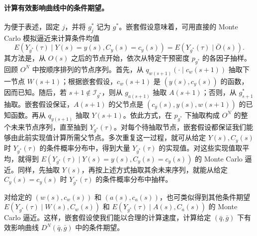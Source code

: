 \paragraph{计算有效影响曲线中的条件期望。}
为便于表述，固定 $j$，并将 $g_j^*$ 记为 $g^*$。嵌套假设意味着，可用直接的 Monte Carlo 模拟逼近来计算条件均值
\[
 E(Y_{g^*}(\tau)\mid Y(s)=y(s),C_y(s)=c_y(s))
 =E(Y_{g^*}(\tau)\mid\bar O(s)).
\]
其方法是，从 $O(s)$ 之后的节点开始，依次从特定干预密度 $p_{g^*}$ 的各因子抽样。回顾 $O^N$ 中按顺序排列的节点序列。首先，从 $q_{w(s+1)}(\cdot\mid c_w(s+1))$ 抽取下一节点 $W(s+1)$；根据嵌套假设，$c_w(s+1)$ 是 $(y(s),c_y(s))$ 的函数，因而已知。随后，若 $s+1\notin\mathcal I_{g^*}$，则从 $g_{a(s+1)}$ 抽取 $A(s+1)$；否则，从 $g^*_{s+1}$ 抽取。嵌套假设保证，$A(s+1)$ 的父节点是 $(c_y(s),y(s),w(s+1))$ 的已知函数。再从 $q_{y(s+1)}$ 抽取 $Y(s+1)$。依此方式，在 $p_{g^*}$ 下抽取构成 $O^N$ 的整个未来节点序列，直至抽到 $Y_{g^*}(\tau)$。对每个待抽取节点，嵌套假设都保证我们能够由此前实现值计算所需父节点。多次重复这一过程，就可从给定 $Y(s),C_y(s)$ 时 $Y_{g^*}(\tau)$ 的条件概率分布中，得到大量 $Y_{g^*}(\tau)$ 的实现值。对这些实现值取平均，就得到 $E(Y_{g^*}(\tau)\mid Y(s)=y(s),C_y(s)=c_y(s))$ 的 Monte Carlo 逼近。同样，先抽取 $Y(s)$，再按上述方式抽取其余未来序列，就能从给定 $C_y(s)=c_y(s)$ 时 $Y_{g^*}(\tau)$ 的条件概率分布中抽样。

对给定的 $(w(s),c_w(s))$ 和 $(a(s),c_a(s))$，也可类似得到其他条件期望 $E(Y_{g^*}(\tau)\mid W(s),C_w(s))$ 和 $E(Y_{g^*}(\tau)\mid A(s),C_a(s))$ 的 Monte Carlo 逼近。这样，嵌套假设使我们能以合理的计算速度，计算给定 $(\bar q,\bar g)$ 下有效影响曲线 $D^N(\bar q,\bar g)$ 中的条件期望。

